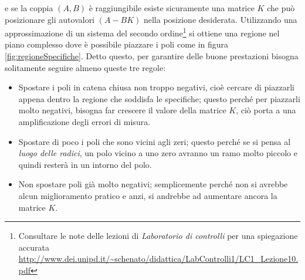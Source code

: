 		\noindent e se la coppia $(A,B)$ è raggiungibile esiste sicuramente una matrice $K$ che può posizionare gli autovalori $(A-BK)$ nella posizione desiderata. Utilizzando una approssimazione di un sistema del secondo ordine\footnote{Consultare le note delle lezioni di \textit{Laboratorio di controlli} per una spiegazione accurata \url{http://www.dei.unipd.it/~schenato/didattica/LabControlli1/LC1_Lezione10.pdf}} si ottiene una regione nel piano complesso dove è possibile piazzare i poli come in figura \ref{fig:regioneSpecifiche}. Detto questo, per garantire delle buone prestazioni bisogna solitamente seguire almeno queste tre regole:
		
		\begin{itemize}
			\item Spostare i poli in catena chiusa non troppo negativi, cioè cercare di piazzarli appena dentro la regione che soddisfa le specifiche; questo perché per piazzarli molto negativi, bisogna far crescere il valore della matrice $K$, ciò porta a una amplificazione degli errori di misura.
			
			\item Spostare di poco i poli che sono vicini agli zeri; questo perché se si pensa al \textit{luogo delle radici}, un polo vicino a uno zero avranno un ramo molto piccolo e quindi resterà in un intorno del polo.
			
			\item  Non spostare poli già molto negativi; semplicemente perché non si avrebbe alcun miglioramento pratico e anzi, si andrebbe ad aumentare ancora la matrice $K$.

		\end{itemize}
		
